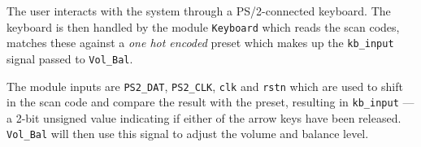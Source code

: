 The user interacts with the system through a PS/2-connected keyboard. The keyboard is then handled by the module \verb?Keyboard? which reads the scan codes, matches these against a \emph{one hot encoded} preset which makes up the \verb?kb_input? signal passed to \verb?Vol_Bal?.

The module inputs are \verb=PS2_DAT=, \verb=PS2_CLK=, \verb=clk= and \verb=rstn= which are used to shift in the scan code and compare the result with the preset, resulting in \verb=kb_input= --- a 2-bit unsigned value indicating if either of the arrow keys have been released. \verb=Vol_Bal= will then use this signal to adjust the volume and balance level.
